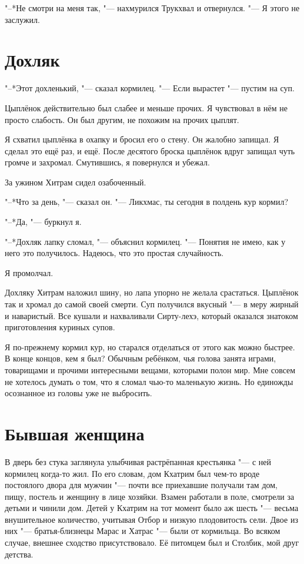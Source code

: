 "--*Не смотри на меня так, "--- нахмурился Трукхвал и отвернулся.
"--- Я этого не заслужил.

\section{Дохляк}

"--*Этот дохленький, "--- сказал кормилец.
"--- Если вырастет "--- пустим на суп.

Цыплёнок действительно был слабее и меньше прочих.
Я чувствовал в нём не просто слабость.
Он был другим, не похожим на прочих цыплят.

Я схватил цыплёнка в охапку и бросил его о стену.
Он жалобно запищал.
Я сделал это ещё раз, и ещё.
После десятого броска цыплёнок вдруг запищал чуть громче и захромал.
Смутившись, я повернулся и убежал.

За ужином Хитрам сидел озабоченный.

"--*Что за день, "--- сказал он.
"--- Ликхмас, ты сегодня в полдень кур кормил?

"--*Да, "--- буркнул я.

"--*Дохляк лапку сломал, "--- объяснил кормилец.
"--- Понятия не имею, как у него это получилось.
Надеюсь, что это простая случайность.

Я промолчал.

Дохляку Хитрам наложил шину, но лапа упорно не желала срастаться.
Цыплёнок так и хромал до самой своей смерти.
Суп получился вкусный "--- в меру жирный и наваристый.
Все кушали и нахваливали Сирту-лехэ, который оказался знатоком приготовления куриных супов.

Я по-прежнему кормил кур, но старался отделаться от этого как можно быстрее.
В конце концов, кем я был?
Обычным ребёнком, чья голова занята играми, товарищами и прочими интересными вещами, которыми полон мир.
Мне совсем не хотелось думать о том, что я сломал чью-то маленькую жизнь.
Но единожды осознанное из головы уже не выбросить.

\section{Бывшая женщина}

В дверь без стука заглянула улыбчивая растрёпанная крестьянка "--- с ней кормилец когда-то жил.
По его словам, дом Кхатрим был чем-то вроде постоялого двора для мужчин "--- почти все приехавшие получали там дом, пищу, постель и женщину в лице хозяйки.
Взамен работали в поле, смотрели за детьми и чинили дом.
Детей у Кхатрим на тот момент было аж шесть "--- весьма внушительное количество, учитывая Отбор и низкую плодовитость сели.
Двое из них "--- братья-близнецы Марас и Хатрас "--- были от кормильца.
Во всяком случае, внешнее сходство присутствовало.
Её питомцем был и Столбик, мой друг детства.

